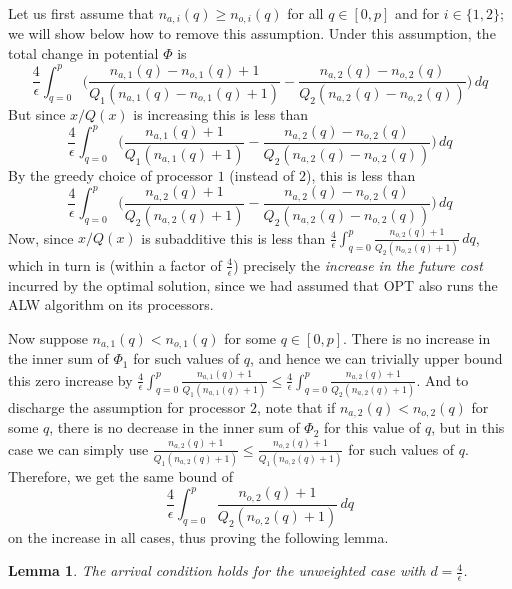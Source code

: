 \documentclass[11pt]{article}
\newtheorem{lemma}{Lemma}[section]
\newcommand{\opt}{\textrm{\sc OPT}\xspace}
\newcommand{\tsty}{}
\newcommand{\alw}{{\sf ALW}\xspace}
\newcommand{\constun}{\frac{4}{\epsilon}}
\begin{document}
Let us first assume that $n_{a,i}(q) \geq n_{o,i}(q)$ for all $q \in
[0,p]$ and for $i \in \{1,2\}$; we will show below how to remove this
assumption. Under this assumption, the total change in potential $\Phi$
is
\[
\tsty \constun \int_{q=0}^{p} \big( \frac{n_{a,1}(q) - n_{o,1}(q)+1}{Q_1(
  n_{a,1}(q) - n_{o,1}(q) + 1)} - \frac{n_{a,2}(q) - n_{o,2}(q) }{Q_2(
  n_{a,2}(q) - n_{o,2}(q))} \big) \,dq
\]
But since $x/Q(x)$ is increasing this is less than
\begin{equation}
  \label{deq:phi1}
\tsty  \constun \int_{q=0}^{p} \big( \frac{n_{a,1}(q) + 1}{Q_1( n_{a,1}(q) + 1)}  -
  \frac{n_{a,2}(q) - n_{o,2}(q) }{Q_2( n_{a,2}(q) - n_{o,2}(q))} \big) \,dq
\end{equation}
By the greedy choice of processor $1$ (instead of $2$), this is less
than
\begin{equation}
  \label{deq:phi2}
\tsty  \constun \int_{q=0}^{p} \big( \frac{n_{a,2}(q) + 1}{Q_2( n_{a,2}(q) + 1)}  -
  \frac{n_{a,2}(q) - n_{o,2}(q) }{Q_2( n_{a,2}(q) - n_{o,2}(q) )} \big) \,dq
\end{equation}
Now, since $x/Q(x)$ is subadditive this is less than $\constun
\int_{q=0}^{p} \frac{n_{o,2}(q) + 1}{Q_2( n_{o,2}(q) + 1)} \,dq$, which in
turn is (within a factor of $\constun$) precisely the \emph{increase in
  the future cost} incurred by the optimal solution, since we had
assumed that \opt also runs the \alw algorithm on its processors.

Now suppose $n_{a,1}(q) < n_{o,1}(q)$ for some $q \in [0,p]$. There
is no increase in the inner sum of $\Phi_1$ for such values of $q$, and
hence we can trivially upper bound this zero increase by $\constun
\int_{q=0}^{p} \frac{n_{a,1}(q) + 1}{Q_1( n_{a,1}(q) + 1)} \leq \constun
\int_{q=0}^{p} \frac{n_{a,2}(q) + 1}{Q_2( n_{a,2}(q) + 1)}$. And to
discharge the assumption for processor $2$, note that if $n_{a,2}(q) <
n_{o,2}(q)$ for some $q$, there is no decrease in the inner sum of
$\Phi_2$ for this value of $q$, but in this case we can simply use
$\frac{n_{a,2}(q) + 1}{Q_1( n_{a,2}(q) + 1)} \leq \frac{n_{o,2}(q) +
  1}{Q_1( n_{o,2}(q) + 1)}$ for such values of $q$.
Therefore, we get the same bound of \[ \constun \int_{q=0}^{p}
\frac{n_{o,2}(q) + 1}{Q_2( n_{o,2}(q) + 1)} \,dq \] on the increase in all
cases, thus proving the following lemma.
\begin{lemma}
  \label{dlem:arrival} The arrival condition holds for the unweighted
  case with $d = \constun$.
\end{lemma}
\end{document}
